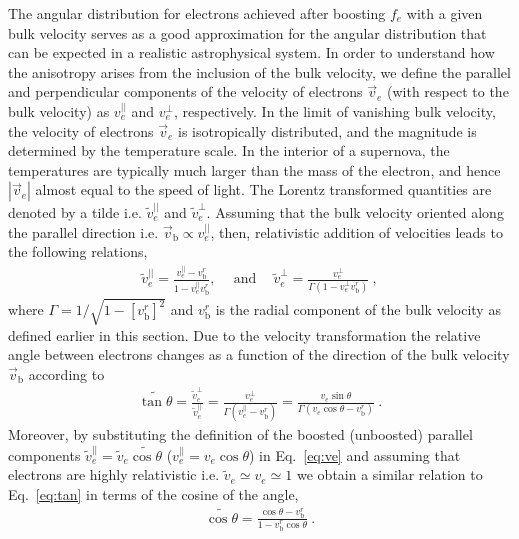 \documentclass[aps, prd, 10pt, twocolumn, superscriptaddress, noshowpacs, preprintnumbers, longbibliography, groupedaddress, footinbib, bibnotes]{revtex4-1}
\newcommand{\vb}{\vec{v}_{\mathrm{b}}}
\newcommand{\vbr}{v_{\mathrm{b}}^{r}}
\begin{document}
The angular distribution for electrons achieved after boosting $f_{e}$ with a given bulk velocity serves as a good approximation for the angular distribution that can be expected in a realistic astrophysical system. In order to understand how the anisotropy arises from the inclusion of the bulk velocity, we define the parallel and perpendicular components of the velocity of electrons $\vec{v}_{e}$ (with respect to the bulk velocity) as $v_{e}^{||}$ and $v_{e}^{\bot}$, respectively. 
In the limit of vanishing bulk velocity, the velocity of electrons $\vec{v}_{e}$ is isotropically distributed, and the magnitude is determined by the temperature scale. In the interior of a supernova, the temperatures are typically much larger than the mass of the electron, and hence $|\vec{v}_{e}|$ almost equal to the speed of light.
The Lorentz transformed quantities are denoted by a tilde i.e. $\widetilde{v}_{e}^{||}$ and $\widetilde{v}_{e}^{\bot}$. Assuming that the bulk velocity oriented along the parallel direction i.e. $\vb \propto v_{e}^{||}$, then, relativistic addition of velocities leads to the following relations, 
\begin{eqnarray}
\label{eq:ve}
	\widetilde{v}_{e}^{||}=\frac{{v}_{e}^{||} - \vbr}{1 - {v}_{e}^{||} \vbr}, \ \quad \mathrm{and} \ \quad \widetilde{v}_{e}^{\bot}=\frac{{v}_{e}^{\bot}}{\Gamma(1 - {v}_{e}^{\bot} \vbr )} \ , 
\end{eqnarray}
where $\Gamma=1/\sqrt{1-[\vbr]^2}$ and $\vbr$ is the radial component of the bulk velocity as defined earlier in this section. Due to the velocity transformation the relative angle between electrons changes as a function of the direction of the bulk velocity $\vb$ according to 
\begin{eqnarray}
\label{eq:tan}
	\widetilde{\tan{\theta}} = \frac{ \widetilde{v}_{e}^{\bot} }{ \widetilde{v}_{e}^{||} } = \frac{ {v}_{e}^{\bot} }{\Gamma ({v}_{e}^{||} - \vbr) } = \frac{ {v}_{e}\sin{\theta} }{ \Gamma({v}_{e}\cos{\theta} - \vbr) }\ . 
\end{eqnarray}
Moreover, by substituting the definition of the boosted (unboosted) parallel components $\widetilde{v}_{e}^{||}=\widetilde{v}_{e}\widetilde{\cos{\theta}}$  ($v_{e}^{||}=v_{e}\cos{\theta}$) in Eq.~\ref{eq:ve} and assuming that electrons are highly relativistic i.e. $\widetilde{v}_{e} \simeq v_{e} \simeq 1$ we obtain a similar relation to Eq.~\ref{eq:tan} in terms of the cosine of the angle,
\begin{eqnarray}
\label{eq:aberr}
	\widetilde{\cos{\theta}} = \frac{ \cos{\theta}-\vbr }{ 1 - \vbr\cos{\theta} }\ .
\end{eqnarray}
\end{document}
